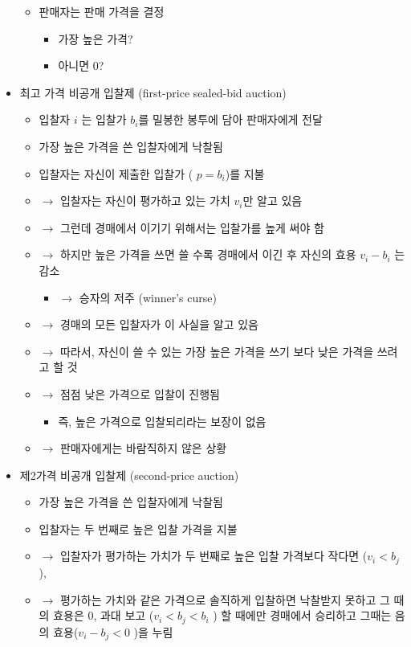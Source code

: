 \begin{itemize}
\begin{itemize}
	\item 판매자는 판매 가격을 결정
		\begin{itemize}
		\item 가장 높은 가격? 
		\item 아니면 0?
		\end{itemize}
	\end{itemize}
\item 최고 가격  비공개 입찰제 (first-price sealed-bid auction)
	\begin{itemize}
	\item 입찰자 $i$ 는 입찰가 $b_{i}$를 밀봉한 봉투에 담아 판매자에게 전달
	\item 가장 높은 가격을 쓴 입찰자에게 낙찰됨
	\item 입찰자는 자신이 제출한 입찰가 ( $p = b_{i}$)를 지불
	\item $\rightarrow$ 입찰자는 자신이 평가하고 있는 가치 $v_{i}$만 알고 있음
	\item $\rightarrow$ 그런데 경매에서 이기기 위해서는 입찰가를 높게 써야 함
	\item $\rightarrow$ 하지만 높은 가격을 쓰면 쓸 수록 경매에서 이긴 후 자신의 효용 $v_{i} - b_{i}$ 는 감소
		\begin{itemize}
		\item $\rightarrow$ 승자의 저주 (winner's curse)
		\end{itemize}
	\item $\rightarrow$ 경매의 모든 입찰자가 이 사실을 알고 있음 
	\item $\rightarrow$ 따라서, 자신이 쓸 수 있는 가장 높은 가격을 쓰기 보다 낮은 가격을 쓰려고 할 것
	\item $\rightarrow$ 점점 낮은 가격으로 입찰이 진행됨
		\begin{itemize}
		\item 즉, 높은 가격으로 입찰되리라는 보장이 없음
		\end{itemize}
	\item $\rightarrow$ 판매자에게는 바람직하지 않은 상황
	\end{itemize}		
\item 제2가격 비공개 입찰제 (second-price auction)
	\begin{itemize}
	\item 가장 높은 가격을 쓴 입찰자에게 낙찰됨
	\item 입찰자는 두 번째로 높은 입찰 가격을 지불
	\item $\rightarrow$ 입찰자가 평가하는 가치가 두 번째로 높은 입찰 가격보다 작다면 ($v_{i} < b_{j}$), 
	\item $\rightarrow$ 평가하는 가치와 같은 가격으로 솔직하게 입찰하면 낙찰받지 못하고 그 때의 효용은 0, 과대 보고 ($v_{i} <  b_{j} < b_{i}$  ) 할 때에만 경매에서 승리하고 그때는 음의 효용($v_{i} - b_{j} < 0$ )을 누림

\end{itemize}
\end{itemize}
